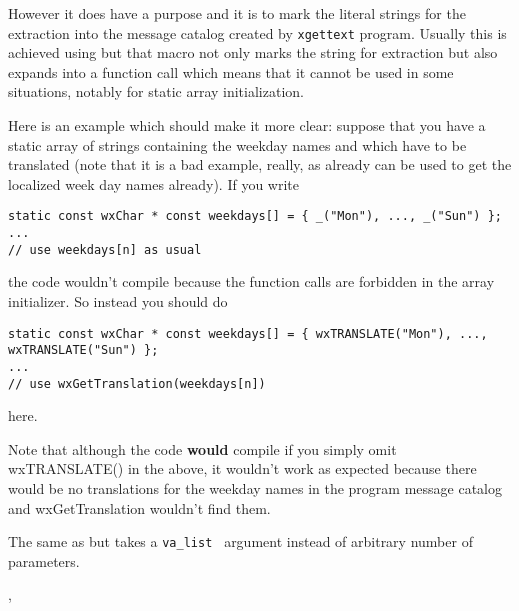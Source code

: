 However it does have a purpose and it is to mark the literal strings for the
extraction into the message catalog created by {\tt xgettext} program. Usually
this is achieved using  but that macro not only marks
the string for extraction but also expands into a 
 function call which means that it
cannot be used in some situations, notably for static array
initialization.

Here is an example which should make it more clear: suppose that you have a
static array of strings containing the weekday names and which have to be
translated (note that it is a bad example, really, as 
 already can be used to get the localized week
day names already). If you write

\begin{verbatim}
static const wxChar * const weekdays[] = { _("Mon"), ..., _("Sun") };
...
// use weekdays[n] as usual
\end{verbatim}

the code wouldn't compile because the function calls are forbidden in the array
initializer. So instead you should do

\begin{verbatim}
static const wxChar * const weekdays[] = { wxTRANSLATE("Mon"), ..., wxTRANSLATE("Sun") };
...
// use wxGetTranslation(weekdays[n])
\end{verbatim}

here.

Note that although the code {\bf would} compile if you simply omit
wxTRANSLATE() in the above, it wouldn't work as expected because there would be
no translations for the weekday names in the program message catalog and
wxGetTranslation wouldn't find them.

\label{wxvsnprintf}


The same as  but takes a {\tt va\_list }
argument instead of arbitrary number of parameters.


, 



\membersection{\_}\label{underscore}

